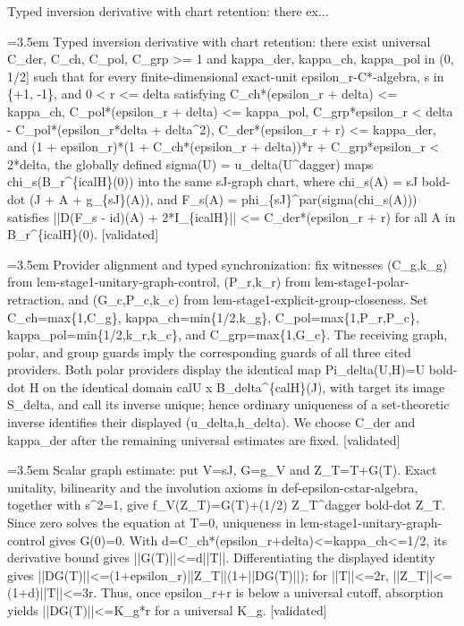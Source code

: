\documentclass{article}
\newcommand{\step}[1]{\par\noindent\hangindent=3.5em\hangafter=1%
  \makebox[3.5em][l]{\textbf{#1.}}}
\newcommand{\steptag}[1]{\hfill{\small\textsf{[#1]}}}
\begin{document}
\begin{proofbox}{Typed inversion derivative with chart retention: there ex...}
\step{1} Typed inversion derivative with chart retention: there exist universal C\_der, C\_ch, C\_pol, C\_grp >= 1 and kappa\_der, kappa\_ch, kappa\_pol in (0, 1/2] such that for every finite-dimensional exact-unit epsilon\_r-C*-algebra, s in \{+1, -1\}, and 0 < r <= delta satisfying C\_ch*(epsilon\_r + delta) <= kappa\_ch, C\_pol*(epsilon\_r + delta) <= kappa\_pol, C\_grp*epsilon\_r < delta - C\_pol*(epsilon\_r*delta + delta\textasciicircum{}2), C\_der*(epsilon\_r + r) <= kappa\_der, and (1 + epsilon\_r)*(1 + C\_ch*(epsilon\_r + delta))*r + C\_grp*epsilon\_r < 2*delta, the globally defined sigma(U) = u\_delta(U\textasciicircum{}dagger) maps chi\_s(B\_r\textasciicircum{}\{icalH\}(0)) into the same sJ-graph chart, where chi\_s(A) = sJ bold-dot (J + A + g\_\{sJ\}(A)), and F\_s(A) = phi\_\{sJ\}\textasciicircum{}par(sigma(chi\_s(A))) satisfies ||D(F\_s - id)(A) + 2*I\_\{icalH\}|| <= C\_der*(epsilon\_r + r) for all A in B\_r\textasciicircum{}\{icalH\}(0). \steptag{validated} \\[6pt]
\step{1.1} Provider alignment and typed synchronization: fix witnesses (C\_g,k\_g) from lem-stage1-unitary-graph-control, (P\_r,k\_r) from lem-stage1-polar-retraction, and (G\_c,P\_c,k\_c) from lem-stage1-explicit-group-closeness. Set C\_ch=max\{1,C\_g\}, kappa\_ch=min\{1/2,k\_g\}, C\_pol=max\{1,P\_r,P\_c\}, kappa\_pol=min\{1/2,k\_r,k\_c\}, and C\_grp=max\{1,G\_c\}. The receiving graph, polar, and group guards imply the corresponding guards of all three cited providers. Both polar providers display the identical map Pi\_delta(U,H)=U bold-dot H on the identical domain calU x B\_delta\textasciicircum{}\{calH\}(J), with target its image S\_delta, and call its inverse unique; hence ordinary uniqueness of a set-theoretic inverse identifies their displayed (u\_delta,h\_delta). We choose C\_der and kappa\_der after the remaining universal estimates are fixed. \steptag{validated} \\[4pt]
\step{1.2} Scalar graph estimate: put V=sJ, G=g\_V and Z\_T=T+G(T). Exact unitality, bilinearity and the involution axioms in def-epsilon-cstar-algebra, together with s\textasciicircum{}2=1, give f\_V(Z\_T)=G(T)+(1/2) Z\_T\textasciicircum{}dagger bold-dot Z\_T. Since zero solves the equation at T=0, uniqueness in lem-stage1-unitary-graph-control gives G(0)=0. With d=C\_ch*(epsilon\_r+delta)<=kappa\_ch<=1/2, its derivative bound gives ||G(T)||<=d||T||. Differentiating the displayed identity gives ||DG(T)||<=(1+epsilon\_r)||Z\_T||(1+||DG(T)||); for ||T||<=2r, ||Z\_T||<=(1+d)||T||<=3r. Thus, once epsilon\_r+r is below a universal cutoff, absorption yields ||DG(T)||<=K\_g*r for a universal K\_g. \steptag{validated} \\[4pt]

\end{proofbox}
\end{document}
